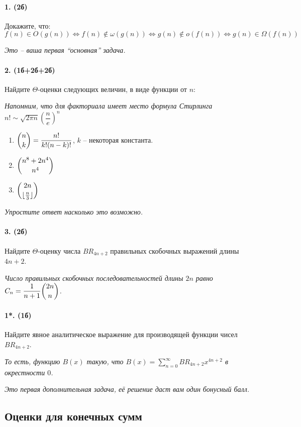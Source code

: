 \documentclass{article}
\begin{document}
\paragraph{1. (2б)} Докажите, что:
\begin{equation*}
    f(n) \in O(g(n)) \iff f(n) \not \in \omega(g(n)) \iff g(n) \not \in o(f(n)) \iff g(n) \in \Omega(f(n))
\end{equation*}

\textit{Это -- ваша первая ``основная'' задача.}

\paragraph{2. (1б+2б+2б)} Найдите $\Theta$-оценки следующих величин, в виде функции от $n$:

\textit{Напомним, что для факториала имеет место формула Стирлинга $n! \sim \sqrt{2\pi n}\left(\dfrac{n}{e}\right)^n$}
\begin{enumerate}
    \item $\dbinom{n}{k} = \dfrac{n!}{k!(n-k)!}$, $k$ -- некоторая константа.
    \item $\dbinom{n^8+2n^4}{n^4}$
    \item $\dbinom{2n}{\lfloor\tfrac{n}{3}\rfloor}$
\end{enumerate}

\textit{Упростите ответ насколько это возможно.}
\paragraph{3. (2б)} Найдите $\Theta$-оценку числа $BR_{4n+2}$ правильных скобочных выражений длины $4n+2$.

\textit{Число правильных скобочных последовательностей длины $2n$ равно $C_n = \dfrac{1}{n+1}\dbinom{2n}{n}$.}
\paragraph{1*. (1б)} Найдите явное аналитическое выражение для производящей функции чисел $BR_{4n+2}$.

\textit{То есть, функцию $B(x)$ такую, что $B(x)=\sum\limits_{n=0}^\infty BR_{4n+2}x^{4n+2}$ в окрестности $0$.}

\textit{Это первая дополнительная задача, её решение даст вам один бонусный балл.}
\subsection*{Оценки для конечных сумм}
\end{document}
